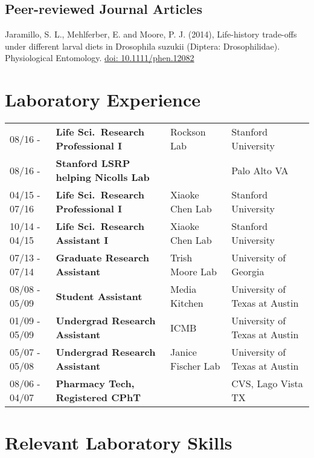 \documentclass[letterpaper]{article}
\renewenvironment{itemize}{
  \begin{list}{}{
    \setlength{\leftmargin}{1.5em}
  }
}{
  \end{list}
}
\begin{document}
\subsection*{Peer-reviewed Journal Articles}

\begin{itemize}
\item Jaramillo, S. L., Mehlferber, E. and Moore, P. J. (2014), 
Life-history trade-offs under different larval diets in Drosophila suzukii 
(Diptera: Drosophilidae). Physiological Entomology. 
\href{http://onlinelibrary.wiley.com/doi/10.1111/phen.12082/full}{doi: 10.1111/phen.12082}
\end{itemize}


\section*{Laboratory Experience}
\begin{tabular}{llll}
08/16 -       & {\bf Life Sci.\ Research Professional I} & Rockson Lab		& Stanford University \\
08/16 -       & {\bf Stanford LSRP helping Nicolls Lab}  &			& Palo Alto VA\\
04/15 -	07/16 & {\bf Life Sci.\ Research Professional I} & Xiaoke Chen Lab	& Stanford University \\
10/14 - 04/15 & {\bf Life Sci.\ Research Assistant I}	& Xiaoke Chen Lab	& Stanford University \\
07/13 - 07/14 & {\bf Graduate Research Assistant}	& Trish Moore Lab	& University of Georgia \\
08/08 - 05/09 & {\bf Student Assistant}			& Media Kitchen		& University of Texas at Austin \\
01/09 - 05/09 & {\bf Undergrad Research Assistant}	& ICMB			& University of Texas at Austin \\
05/07 - 05/08 & {\bf Undergrad Research Assistant}	& Janice Fischer Lab	& University of Texas at Austin \\
08/06 - 04/07 & {\bf Pharmacy Tech, Registered CPhT}	& 			& CVS, Lago Vista TX \\
\end{tabular}


\section*{Relevant Laboratory Skills}
\end{document}
